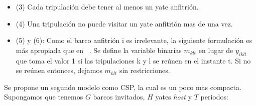 \documentclass[letter, 10pt]{article}
\begin{document}
\begin{itemize}
\begin{itemize}
        \item (3) Cada tripulación debe tener al menos un yate anfitrión.
        \item (4) Una tripulación no puede visitar un yate anfitrión mas de una vez. 
        \item (5) y (6): Como el barco anfitrión i es irrelevante, la siguiente formulación es más apropiada que en ~\cite{Walser:1997:SLP:1867406.1867448}. Se define la variable binarias $m_{klt}$ en lugar de $y_{iklt}$ que toma el valor 1 si las tripulaciones k y l se reúnen en el instante t. Si no se reúnen entonces, dejamos $m_{klt}$ sin restricciones.
    \end{itemize}
\end{itemize}

Se propone un segundo modelo como CSP, la cual es un poco mas compacta. Supongamos que tenemos $G$ barcos invitados, $H$ yates \textit{host} y $T$ periodos:
\end{document}
